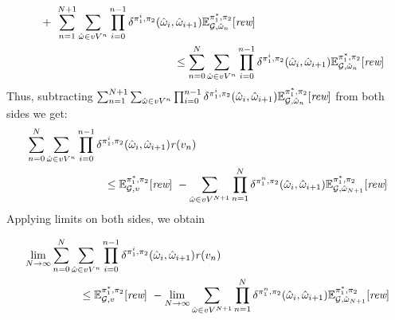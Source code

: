 \begin{myproof}
\begin{align*}
    & \quad + \
	\sum^{N+1}_{n=1} \sum_{\hat{\omega} \in vV^{n}} \prod^{n-1}_{i=0}\delta^{\strat{1}^i,\strat{2}}(\hat{\omega}_i,\hat{\omega}_{i+1})  \Expect{\starredstrat{1}}{\strat{2}}_{\StochG,\hat{\omega}_{n}}[\Rewards] \\
    & \hspace{13em} \leq 
	 \sum^{N}_{n=0}
	\sum_{\hat{\omega} \in vV^{n}} \prod^{n-1}_{i=0}\delta^{\strat{1}^i,\strat{2}}(\hat{\omega}_i, \hat{\omega}_{i+1}) \Expect{\starredstrat{1}}{\strat{2}}_{\StochG,\hat{\omega}_n}[\Rewards]
  \end{align*}
  Thus, subtracting $\sum^{N+1}_{n=1} \sum_{\hat{\omega} \in vV^{n}} \prod^{n-1}_{i=0}\delta^{\pi_{1}^i,\pi_{2}}(\hat{\omega}_i,\hat{\omega}_{i+1})  \mathbb{E}^{\pi^*_{1}, \pi_{2}}_{\mathcal{G},\hat{\omega}_{n}}[\textit{rew}]$ from both sides we get:
  \begin{align*}
    & \sum^{N}_{n=0}\sum_{\hat{\omega} \in vV^{n}} \prod^{n-1}_{i=0}\delta^{\pi_{1}^i,\pi_{2}}(\hat{\omega}_i, \hat{\omega}_{i+1}) \mathit{r}(v_n)\\
    & \hspace{7em} \leq 
      \mathbb{E}^{\pi^*_{1}, \pi_{2}}_{\mathcal{G},v}[\textit{rew}] \ - \sum_{\hat{\omega} \in vV^{N+1}}\prod^{N}_{n=1}\delta^{\pi_{1}^n,\pi_{2}}(\hat{\omega}_i,\hat{\omega}_{i+1}) \mathbb{E}^{\pi^*_{1}, \pi_{2}}_{\mathcal{G}, \hat{\omega}_{N+1}}[\textit{rew}]
  \end{align*}
  Applying limits on both sides, we obtain

  \begin{align}
    & \lim_{N \rightarrow \infty} \sum^{N}_{n=0}\sum_{\hat{\omega} \in vV^{n}} \prod^{n-1}_{i=0}\delta^{\pi_{1}^i,\pi_{2}}(\hat{\omega}_i, \hat{\omega}_{i+1}) \mathit{r}(v_n) \label{th:semimarkov-to-memoryless-eq0}\\
    & \hspace{5em} \leq 
      \mathbb{E}^{\pi^*_{1}, \pi_{2}}_{\mathcal{G},v}[\textit{rew}] \ - \lim_{N \rightarrow \infty} \sum_{\hat{\omega} \in vV^{N+1}}\prod^{N}_{n=1}\delta^{\pi_{1}^n,\pi_{2}}(\hat{\omega}_i,\hat{\omega}_{i+1}) \mathbb{E}^{\pi^*_{1}, \pi_{2}}_{\mathcal{G}, \hat{\omega}_{N+1}}[\textit{rew}] \notag
  \end{align}


\end{myproof}
